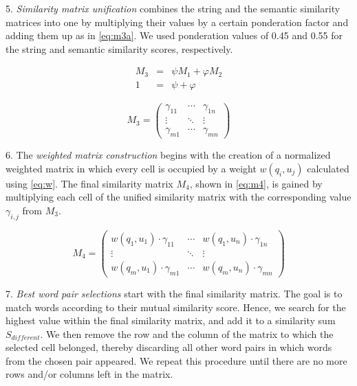 \documentclass[conference]{IEEEtran}
\begin{document}
5. {\it Similarity matrix unification} combines the string and the semantic similarity matrices into one by multiplying their values by a certain ponderation factor and adding them up as in \ref{eq:m3a}. We used ponderation values of 0.45 and 0.55 for the string and semantic similarity scores, respectively.

\begin{eqnarray}
	\label{eq:m3a}
	M_3 & = & \psi M_1 + \varphi M_2 \\
	1 & = & \psi + \varphi
\end{eqnarray}

\begin{equation}
	\label{eq:m3b}
	M_3 = 
\left( 
	\begin{array}{ccc}
		\gamma_{11} & \cdots & \gamma_{1n} \\
		\vdots & \ddots & \vdots \\
		\gamma_{m1} & \cdots & \gamma_{mn} 
	\end{array} 
\right)
\end{equation}

6. The {\it weighted matrix construction} begins with the creation of a normalized weighted matrix in which every cell is occupied by a weight $w(q_i,u_j)$ calculated using \ref{eq:w}. The final similarity matrix $M_4$, shown in \ref{eq:m4}, is gained by multiplying each cell of the unified similarity matrix with the corresponding value $\gamma_{i,j}$ from $M_3$.

\begin{equation}
	\label{eq:m4}
	M_4 = 
\left( 
	\begin{array}{ccc}
		w(q_1,u_1)\cdot \gamma_{11} & \cdots & w(q_1,u_n)\cdot \gamma_{1n} \\
		\vdots & \ddots & \vdots \\
		w(q_m,u_1)\cdot \gamma_{m1} & \cdots & w(q_m,u_n)\cdot \gamma_{mn} 
	\end{array} 
\right)
\end{equation}

7. {\it Best word pair selections} start with the final similarity matrix. The goal is to match words according to their mutual similarity score. Hence, we search for the highest value within the final similarity matrix, and add it to a similarity sum $S_{different}$. We then remove the row and the column of the matrix to which the selected cell belonged, thereby discarding all other word pairs in which words from the chosen pair appeared. We repeat this procedure until there are no more rows and/or columns left in the matrix.
 
\end{document}
